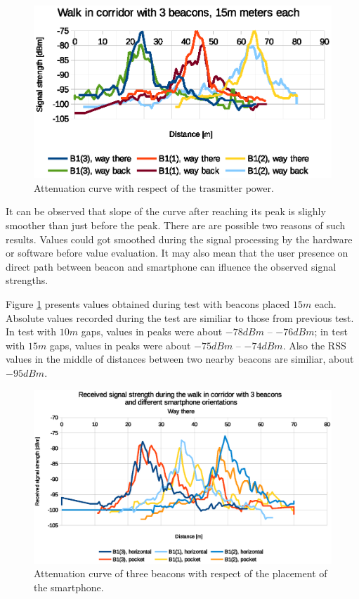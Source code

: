 \documentclass[../main.tex]{subfiles}
\begin{document}
\begin{figure}[!htbp]
\includegraphics[width=\textwidth, keepaspectratio]{pictures/tests_case10_walk_15m_raw}
\centering
\caption{Attenuation curve with respect of the trasmitter power.}
\label{fig:tests_case10_walk_15m_raw}
\end{figure}

It can be observed that slope of the curve after reaching its peak is slighly smoother than just before the peak. There are are possible two reasons of such results. Values could got smoothed during the signal processing by the hardware or software before value evaluation. It may also mean that the user presence on direct path between beacon and smartphone can ifluence the observed signal strengths.

Figure \ref{fig:tests_case10_walk_15m_raw} presents values obtained during test with beacons placed $15m$ each. Absolute values recorded during the test are similiar to those from previous test. In test with $10m$ gaps, values in peaks were about $-78dBm$ -- $-76dBm$; in test with $15m$ gaps, values in peaks were about $-75dBm$ -- $-74dBm$. Also the RSS values in the middle of distances between two nearby beacons are similiar, about $-95dBm$.

\begin{figure}[!htbp]
\includegraphics[width=\textwidth, keepaspectratio]{pictures/tests_case11_walk_10m_smartphone_orientation}
\centering
\caption{Attenuation curve of three beacons with respect of the placement of the smartphone.}
\label{fig:tests_case11_walk_10m_smartphone_orientation}
\end{figure}
\end{document}
